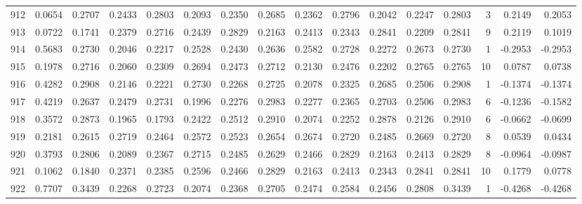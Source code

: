 \begin{tabular}{lrrrrrrrrrrrrrrr}
912 &      0.0654 &  0.2707 &  0.2433 &  0.2803 &  0.2093 &  0.2350 &  0.2685 &  0.2362 &  0.2796 &  0.2042 &   0.2247 &     0.2803 &      3 &                    0.2149 &                     0.2053 \\
913 &      0.0722 &  0.1741 &  0.2379 &  0.2716 &  0.2439 &  0.2829 &  0.2163 &  0.2413 &  0.2343 &  0.2841 &   0.2209 &     0.2841 &      9 &                    0.2119 &                     0.1019 \\
914 &      0.5683 &  0.2730 &  0.2046 &  0.2217 &  0.2528 &  0.2430 &  0.2636 &  0.2582 &  0.2728 &  0.2272 &   0.2673 &     0.2730 &      1 &                   -0.2953 &                    -0.2953 \\
915 &      0.1978 &  0.2716 &  0.2060 &  0.2309 &  0.2694 &  0.2473 &  0.2712 &  0.2130 &  0.2476 &  0.2202 &   0.2765 &     0.2765 &     10 &                    0.0787 &                     0.0738 \\
916 &      0.4282 &  0.2908 &  0.2146 &  0.2221 &  0.2730 &  0.2268 &  0.2725 &  0.2078 &  0.2325 &  0.2685 &   0.2506 &     0.2908 &      1 &                   -0.1374 &                    -0.1374 \\
917 &      0.4219 &  0.2637 &  0.2479 &  0.2731 &  0.1996 &  0.2276 &  0.2983 &  0.2277 &  0.2365 &  0.2703 &   0.2506 &     0.2983 &      6 &                   -0.1236 &                    -0.1582 \\
918 &      0.3572 &  0.2873 &  0.1965 &  0.1793 &  0.2422 &  0.2512 &  0.2910 &  0.2074 &  0.2252 &  0.2878 &   0.2126 &     0.2910 &      6 &                   -0.0662 &                    -0.0699 \\
919 &      0.2181 &  0.2615 &  0.2719 &  0.2464 &  0.2572 &  0.2523 &  0.2654 &  0.2674 &  0.2720 &  0.2485 &   0.2669 &     0.2720 &      8 &                    0.0539 &                     0.0434 \\
920 &      0.3793 &  0.2806 &  0.2089 &  0.2367 &  0.2715 &  0.2485 &  0.2629 &  0.2466 &  0.2829 &  0.2163 &   0.2413 &     0.2829 &      8 &                   -0.0964 &                    -0.0987 \\
921 &      0.1062 &  0.1840 &  0.2371 &  0.2385 &  0.2596 &  0.2466 &  0.2829 &  0.2163 &  0.2413 &  0.2343 &   0.2841 &     0.2841 &     10 &                    0.1779 &                     0.0778 \\
922 &      0.7707 &  0.3439 &  0.2268 &  0.2723 &  0.2074 &  0.2368 &  0.2705 &  0.2474 &  0.2584 &  0.2456 &   0.2808 &     0.3439 &      1 &                   -0.4268 &                    -0.4268 \\

\end{tabular}

